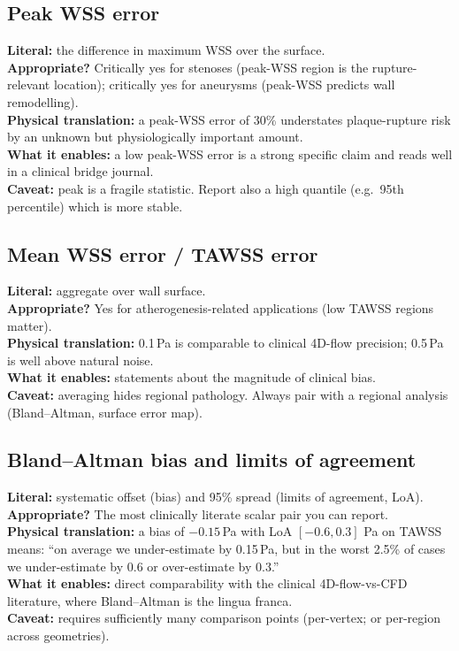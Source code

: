 \documentclass[11pt]{article}
\begin{document}
\subsection*{Peak WSS error}
\textbf{Literal:} the difference in maximum WSS over the surface.\\
\textbf{Appropriate?} Critically yes for stenoses (peak-WSS region is the rupture-relevant location); critically yes for aneurysms (peak-WSS predicts wall remodelling).\\
\textbf{Physical translation:} a peak-WSS error of 30\% understates plaque-rupture risk by an unknown but physiologically important amount.\\
\textbf{What it enables:} a low peak-WSS error is a strong specific claim and reads well in a clinical bridge journal.\\
\textbf{Caveat:} peak is a fragile statistic. Report also a high quantile (e.g.\ 95th percentile) which is more stable.

\subsection*{Mean WSS error / TAWSS error}
\textbf{Literal:} aggregate over wall surface.\\
\textbf{Appropriate?} Yes for atherogenesis-related applications (low TAWSS regions matter).\\
\textbf{Physical translation:} 0.1\,Pa is comparable to clinical 4D-flow precision; 0.5\,Pa is well above natural noise.\\
\textbf{What it enables:} statements about the magnitude of clinical bias.\\
\textbf{Caveat:} averaging hides regional pathology. Always pair with a regional analysis (Bland--Altman, surface error map).

\subsection*{Bland--Altman bias and limits of agreement}
\textbf{Literal:} systematic offset (bias) and 95\% spread (limits of agreement, LoA).\\
\textbf{Appropriate?} The most clinically literate scalar pair you can report.\\
\textbf{Physical translation:} a bias of $-0.15$\,Pa with LoA $[-0.6, 0.3]$ Pa on TAWSS means: ``on average we under-estimate by 0.15\,Pa, but in the worst 2.5\% of cases we under-estimate by 0.6 or over-estimate by 0.3.''\\
\textbf{What it enables:} direct comparability with the clinical 4D-flow-vs-CFD literature, where Bland--Altman is the lingua franca.\\
\textbf{Caveat:} requires sufficiently many comparison points (per-vertex; or per-region across geometries).
\end{document}

